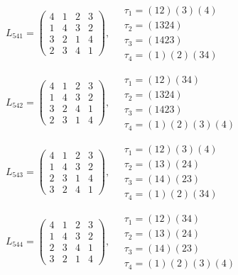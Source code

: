 $L_{541} = \begin{pmatrix} 4 & 1 & 2 & 3 \\ 1 & 4 & 3 & 2 \\ 3 & 2 & 1 & 4 \\ 2 & 3 & 4 & 1 \end{pmatrix}, \quad \begin{matrix} \tau_{1} = (1 2)(3)(4) \\ \tau_{2} = (1 3 2 4) \\ \tau_{3} = (1 4 2 3) \\ \tau_{4} = (1)(2)(3 4) \end{matrix}$

$L_{542} = \begin{pmatrix} 4 & 1 & 2 & 3 \\ 1 & 4 & 3 & 2 \\ 3 & 2 & 4 & 1 \\ 2 & 3 & 1 & 4 \end{pmatrix}, \quad \begin{matrix} \tau_{1} = (1 2)(3 4) \\ \tau_{2} = (1 3 2 4) \\ \tau_{3} = (1 4 2 3) \\ \tau_{4} = (1)(2)(3)(4) \end{matrix}$

$L_{543} = \begin{pmatrix} 4 & 1 & 2 & 3 \\ 1 & 4 & 3 & 2 \\ 2 & 3 & 1 & 4 \\ 3 & 2 & 4 & 1 \end{pmatrix}, \quad \begin{matrix} \tau_{1} = (1 2)(3)(4) \\ \tau_{2} = (1 3)(2 4) \\ \tau_{3} = (1 4)(2 3) \\ \tau_{4} = (1)(2)(3 4) \end{matrix}$

$L_{544} = \begin{pmatrix} 4 & 1 & 2 & 3 \\ 1 & 4 & 3 & 2 \\ 2 & 3 & 4 & 1 \\ 3 & 2 & 1 & 4 \end{pmatrix}, \quad \begin{matrix} \tau_{1} = (1 2)(3 4) \\ \tau_{2} = (1 3)(2 4) \\ \tau_{3} = (1 4)(2 3) \\ \tau_{4} = (1)(2)(3)(4) \end{matrix}$

